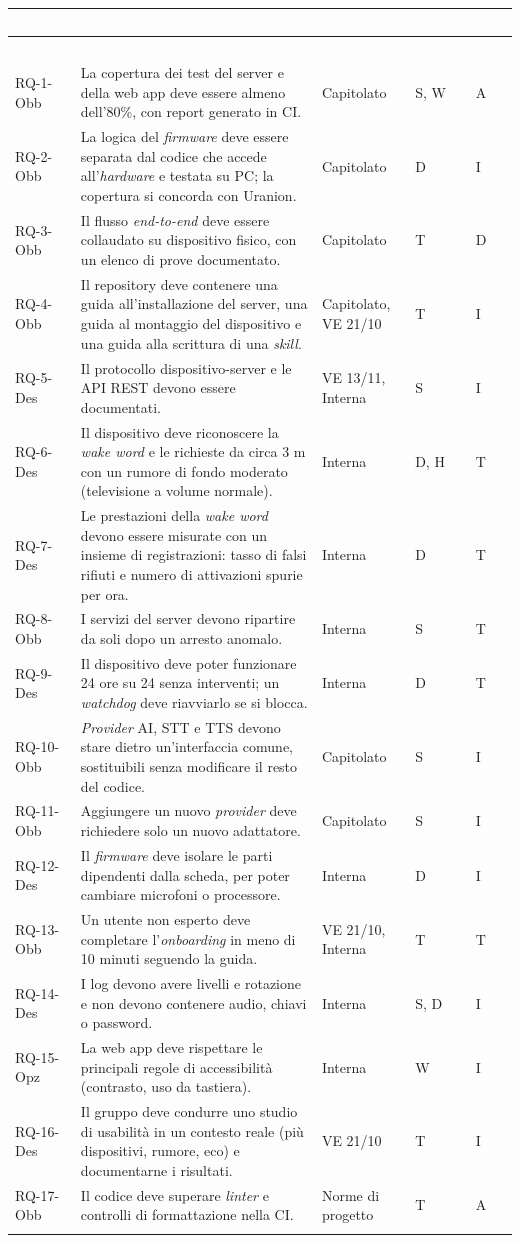 \documentclass[12pt,a4paper]{article}
\newcommand{\thc}[1]{\textcolor{white}{\textbf{#1}}}
\newcommand{\rl}{\\ \arrayrulecolor{bfline}\hline}
\begin{document}
\begin{longtable}{>{\raggedright\arraybackslash}p{}>{\raggedright\arraybackslash}p{}>{\raggedright\arraybackslash}p{}>{\raggedright\arraybackslash}p{}>{\centering\arraybackslash}p{}}
\rowcolor{bfblue}\thc{Codice} & \thc{Descrizione} & \thc{Fonti} & \thc{Comp.} & \thc{Ver.} \\
\endfirsthead
\rowcolor{bfblue}\thc{Codice} & \thc{Descrizione} & \thc{Fonti} & \thc{Comp.} & \thc{Ver.} \\
\endhead
RQ-1-Obb & La copertura dei test del server e della web app deve essere almeno dell'80\%, con report generato in CI. & Capitolato & S, W & A \rl
RQ-2-Obb & La logica del \emph{firmware} deve essere separata dal codice che accede all'\emph{hardware} e testata su PC; la copertura si concorda con Uranion. & Capitolato & D & I \rl
RQ-3-Obb & Il flusso \emph{end-to-end} deve essere collaudato su dispositivo fisico, con un elenco di prove documentato. & Capitolato & T & D \rl
RQ-4-Obb & Il repository deve contenere una guida all'installazione del server, una guida al montaggio del dispositivo e una guida alla scrittura di una \emph{skill}. & Capitolato, VE 21/10 & T & I \rl
RQ-5-Des & Il protocollo dispositivo-server e le API REST devono essere documentati. & VE 13/11, Interna & S & I \rl
RQ-6-Des & Il dispositivo deve riconoscere la \emph{wake word} e le richieste da circa 3 m con un rumore di fondo moderato (televisione a volume normale). & Interna & D, H & T \rl
RQ-7-Des & Le prestazioni della \emph{wake word} devono essere misurate con un insieme di registrazioni: tasso di falsi rifiuti e numero di attivazioni spurie per ora. & Interna & D & T \rl
RQ-8-Obb & I servizi del server devono ripartire da soli dopo un arresto anomalo. & Interna & S & T \rl
RQ-9-Des & Il dispositivo deve poter funzionare 24 ore su 24 senza interventi; un \emph{watchdog} deve riavviarlo se si blocca. & Interna & D & T \rl
RQ-10-Obb & \emph{Provider} AI, STT e TTS devono stare dietro un'interfaccia comune, sostituibili senza modificare il resto del codice. & Capitolato & S & I \rl
RQ-11-Obb & Aggiungere un nuovo \emph{provider} deve richiedere solo un nuovo adattatore. & Capitolato & S & I \rl
RQ-12-Des & Il \emph{firmware} deve isolare le parti dipendenti dalla scheda, per poter cambiare microfoni o processore. & Interna & D & I \rl
RQ-13-Obb & Un utente non esperto deve completare l'\emph{onboarding} in meno di 10 minuti seguendo la guida. & VE 21/10, Interna & T & T \rl
RQ-14-Des & I log devono avere livelli e rotazione e non devono contenere audio, chiavi o password. & Interna & S, D & I \rl
RQ-15-Opz & La web app deve rispettare le principali regole di accessibilità (contrasto, uso da tastiera). & Interna & W & I \rl
RQ-16-Des & Il gruppo deve condurre uno studio di usabilità in un contesto reale (più dispositivi, rumore, eco) e documentarne i risultati. & VE 21/10 & T & I \rl
RQ-17-Obb & Il codice deve superare \emph{linter} e controlli di formattazione nella CI. & Norme di progetto & T & A \rl
\end{longtable}
\end{document}
